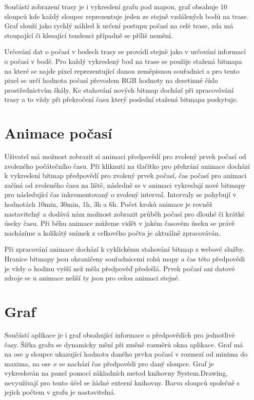 \documentclass[czech,bachelor,dept460,male,csharp,cpdeclaration]{diploma}
\begin{document}
	Součástí zobrazení trasy je i vykreslení grafu pod mapou, graf obsahuje 10 sloupců kde každý sloupec reprezentuje jeden ze stejně vzdálených bodů na trase. Graf slouží jako rychlý náhled k určení postupu počasí na celé trase, zda má stoupající či klesající tendenci případně se příliš nemění.
	
	Určování dat o počasí v bodech trasy se provádí stejně jako v určování informací o počasí v bodě. Pro každý vykreslený bod na trase se použije stažená bitmapa na které se najde pixel reprezentující danou zeměpisnou souřadnici a pro tento pixel se určí hodnota počasí převodem RGB hodnoty na desetinné číslo prostřednictvím škály. Ke stahování nových bitmap dochází při zpracovávání trasy a to vždy při překročení času který poslední stažená bitmapa poskytuje.
	
	\section{Animace počasí}
	
	Uživatel má možnost zobrazit si animaci předpovědí pro zvolený prvek počasí od zvoleného počátečního času. Při kliknutí na tlačítko pro přehrání animace dochází k vykreslení bitmap předpovědí pro zvolený prvek počasí, čas počasí pro animaci začíná od zvoleného času na liště, následně se v animaci vykreslují nové bitmapy pro následující čas inkrementovaný o zvolený interval. Intervaly se pohybují v hodnotách 10min, 30min, 1h, 3h a 6h. Počet kroků animace je rovněž nastavitelný a dodává nám možnost zobrazit průběh počasí pro dlouhé či krátké úseky času. Při běhu animace můžeme vidět v jakém časovém úseku se právě nacházíme a kolikátý snímek z celkového počtu je aktuálně zpracováván.
	
	Při zpracování animace dochází k cyklickému stahování bitmap z webové služby. Hranice bitmapy jsou ohraničeny souřadnicemi rohů mapy a čas této předpovědi je vždy o hodinu vyšší než měla předpověď předešlá. Prvek počasí ani datové zdroje se u animace neliší ty jsou pro celou animaci stejné.
	
	\section{Graf}
	
	Součástí aplikace je i graf obsahující informace o předpovědích pro jednotlivé časy. Šířka grafu se dynamicky mění při změně rozměrů okna aplikace. Graf má na ose $y$ sloupce ukazující hodnotu daného prvku počasí v rozmezí od minima do maxima, na ose $x$ se nachází čas předpovědi pro daný sloupce. Graf je vykreslován na panel pomocí základních metod knihovny System.Drawing, nevyužívají pro tento účel se žádné externí knihovny. Barva sloupců společně s jejich počtem v grafu je nastavitelná.
	
\end{document}

